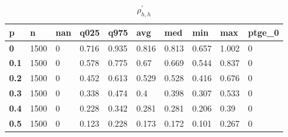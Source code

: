 \begin{table}[h]
 \centering 
\footnotesize
\caption{$\rho_{h,h}^\prime $}
\label{tab:alphahh}
\begin{tabular}[h]{|l|l|l|l|l|l|l|l|l|l|
    } \hline
\textbf{ p} & \textbf{ n} & \textbf{ nan} & \textbf{ q025} & \textbf{ q975} & \textbf{ avg} & \textbf{ med} & \textbf{ min} & \textbf{ max} & \textbf{ ptge\_0}
    \\ \hline
  \textbf{  0} & 1500 & 0 & 0.716 & 0.935 & 0.816 & 0.813 & 0.657 & 1.002 & 0
    \\ \hline
  \textbf{0.1} & 1500 & 0 & 0.578 & 0.775 &  0.67 & 0.669 & 0.544 & 0.837 & 0
    \\ \hline
  \textbf{0.2} & 1500 & 0 & 0.452 & 0.613 & 0.529 & 0.528 & 0.416 & 0.676 & 0
    \\ \hline
  \textbf{0.3} & 1500 & 0 & 0.338 & 0.474 &   0.4 & 0.398 & 0.307 & 0.533 & 0
    \\ \hline
  \textbf{0.4} & 1500 & 0 & 0.228 & 0.342 & 0.281 & 0.281 & 0.206 &  0.39 & 0
    \\ \hline
  \textbf{0.5} & 1500 & 0 & 0.123 & 0.228 & 0.173 & 0.172 & 0.101 & 0.267 & 0
    \\ \hline
 \end{tabular}
 \end{table}
